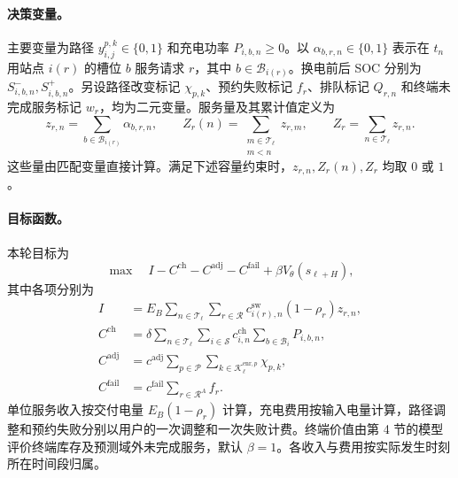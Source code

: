 \documentclass[12pt,a4paper,UTF8]{ctexart}
\numberwithin{equation}{section}
\newcommand{\R}{\mathcal R}
\begin{document}
\paragraph{决策变量。}
主要变量为路径 $y_{i,j}^{p,k}\in\{0,1\}$ 和充电功率 $P_{i,b,n}\ge0$。以 $\alpha_{b,r,n}\in\{0,1\}$ 表示在 $t_n$ 用站点 $i(r)$ 的槽位 $b$ 服务请求 $r$，其中 $b\in\mathcal B_{i(r)}$。换电前后 SOC 分别为 $S_{i,b,n}^{-},S_{i,b,n}^{+}$。另设路径改变标记 $\chi_{p,k}$、预约失败标记 $f_r$、排队标记 $Q_{r,n}$ 和终端未完成服务标记 $w_r$，均为二元变量。服务量及其累计值定义为
\begin{equation}
z_{r,n}=\sum_{b\in\mathcal B_{i(r)}}\alpha_{b,r,n},\qquad
Z_r(n)=\sum_{\substack{m\in\mathcal T_\ell\\m<n}}z_{r,m},\qquad
Z_r=\sum_{n\in\mathcal T_\ell}z_{r,n}.
\label{eq:service_sums}
\end{equation}
这些量由匹配变量直接计算。满足下述容量约束时，$z_{r,n},Z_r(n),Z_r$ 均取 $0$ 或 $1$。

\paragraph{目标函数。}
本轮目标为
\begin{equation}
\max\quad I-C^{\mathrm{ch}}-C^{\mathrm{adj}}-C^{\mathrm{fail}}
+\beta V_\theta(s_{\ell+H}),
\label{eq:objective}
\end{equation}
其中各项分别为
\begin{subequations}\label{eq:objective_terms}
\begin{align}
I&=E_B\sum_{n\in\mathcal T_\ell}\sum_{r\in\R}
c_{i(r),n}^{\mathrm{sw}}(1-\rho_r)z_{r,n},\label{eq:income}\\
C^{\mathrm{ch}}&=\delta\sum_{n\in\mathcal T_\ell}\sum_{i\in\mathcal S}
c_{i,n}^{\mathrm{ch}}\sum_{b\in\mathcal B_i}P_{i,b,n},\label{eq:charging_cost}\\
C^{\mathrm{adj}}&=c^{\mathrm{adj}}\sum_{p\in\mathcal P}\sum_{k\in\mathcal K_\ell^{\mathrm{enr},p}}\chi_{p,k},\label{eq:adjustment_cost}\\
C^{\mathrm{fail}}&=c^{\mathrm{fail}}\sum_{r\in\R^A}f_r.\label{eq:failure_cost}
\end{align}
\end{subequations}
单位服务收入按交付电量 $E_B(1-\rho_r)$ 计算，充电费用按输入电量计算，路径调整和预约失败分别以用户的一次调整和一次失败计费。终端价值由第 4 节的模型评价终端库存及预测域外未完成服务，默认 $\beta=1$。各收入与费用按实际发生时刻所在时间段归属。
\end{document}
